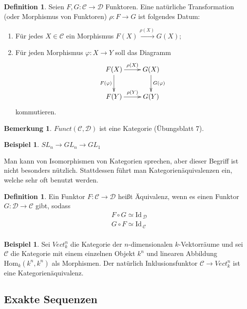\documentclass[reqno,12pt]{article}
\numberwithin{equation}{section}
\newcommand{\cC}{\mathcal{C}}
\newcommand{\cD}{\mathcal{D}}
\newcommand{\iso}{\simeq}
\newcommand{\Id}{\text{Id}\,}
\newcommand{\Hom}{\text{Hom}}
\theoremstyle{plain}
\theoremstyle{definition}
\newtheorem{definition}[thm]{Definition}
\newtheorem{example}[thm]{Beispiel}
\newtheorem{remark}[thm]{Bemerkung}
\begin{document}
\begin{definition}
Seien $F,G \colon \cC \to \cD$ Funktoren. Eine natürliche Transformation (oder Morphismus von Funktoren) $\rho \colon F \to G$ ist folgendes Datum:
\begin{enumerate}
  \item Für jedes $X \in \cC$ ein Morphismus $F(X) \overset{\rho(X)}{\to} G(X)$;
  \item Für jeden Morphismus $\varphi \colon X \to Y$ soll das Diagramm
  \begin{align*}
  \xymatrix{
  F(X) \ar[r]^{\rho(X)} \ar[d]_{F(\varphi)} & G(X) \ar[d]^{G(\varphi)} \\
  F(Y) \ar[r]^{\rho(Y)} & G(Y)
  }
  \end{align*}
  kommutieren.
\end{enumerate}
\end{definition}

\begin{remark}
$Funct(\cC, \cD)$ ist eine Kategorie (Übungsblatt 7).
\end{remark}

\begin{example}
$SL_n \to GL_n \to GL_1$
\end{example}

Man kann von Isomorphismen von Kategorien sprechen, aber dieser Begriff ist nicht besonders nützlich. Stattdessen führt man Kategorienäquivalenzen ein, welche sehr oft benutzt werden.
\begin{definition}
Ein Funktor $F\colon \cC \to \cD$ heißt {\sf Äquivalenz}, wenn es einen Funktor $G \colon \cD \to \cC$ gibt, sodass
\begin{align*}
& F \circ G \iso \Id_{\cD} \\
& G \circ F \iso \Id_{\cC} \\
\end{align*}
\end{definition}


\begin{example}
Sei $Vect_k^{n}$ die Kategorie der $n$-dimensionalen $k$-Vektorräume und sei $\cC$ die Kategorie mit einem einzelnen Objekt $k^n$ und linearen Abbildung $\Hom_k(k^n,k^n)$ als Morphismen. Der natürlich Inklusionsfunktor $\cC \to Vect_k^{n}$ ist eine Kategorienäquivalenz. \end{example}



\subsection{Exakte Sequenzen}
\end{document}

